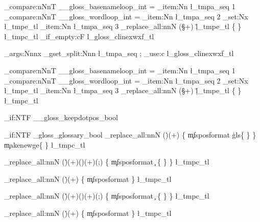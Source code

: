 {{		\int_compare:nNnT
								  { \g__gloss_basenameloop_int } = { \seq_item:Nn \l_tmpa_seq { 1 } } %
								  {
		\int_compare:nNnT
								  { \g__gloss_wordloop_int } = { \seq_item:Nn \l_tmpa_seq { 2 } } %
								  {
\tl_set:Nx \l_tmpe_tl { \seq_item:Nn \l_tmpa_seq { 3 } } %
		\regex_replace_all:nnN
				{ (\S+) }
				{ \c{\u{l_tmpe_tl}} \cB\{ \0 \cE\} }
				\l_tmpc_tl
												}}%
			}%
		\tl_if_empty:cF { l_gloss_clinexwxf_tl }
		{  
			\exp_args:Nnnx
	\seq_gset_split:Nnn 
		\l_tmpa_seq
			{ ; } %
			{ \tl_use:c { l_gloss_clinexwxf_tl } }
			
		\int_compare:nNnT
								  { \g__gloss_basenameloop_int } = { \seq_item:Nn \l_tmpa_seq { 1 } } %
								  {
		\int_compare:nNnT
								  { \g__gloss_wordloop_int } = { \seq_item:Nn \l_tmpa_seq { 2 } } %
								  {
\tl_set:Nx \l_tmpe_tl { \seq_item:Nn \l_tmpa_seq { 3 } } %
		\regex_replace_all:nnN
				{ (\S+) }
				{ \c{\u{l_tmpe_tl}} \cB\{ \0 \cE\} }
				\l_tmpc_tl
												}}%
			}%









		\bool_if:NTF
		\g__gloss_keepdotpos_bool
		{
			\bool_if:NTF
			\g_gloss_glossary_bool
			{
		\regex_replace_all:nnN
				{ (\.)(\w+) }
				{ \1 \cB\{ \c{mfsposformat} \c{gls}\cB\{ \2 \cE\} \cE\}
					\c{makenewge}\cB\{ \2 \cE\}
				} %
				\l_tmpc_tl
			}
			{

		\regex_replace_all:nnN
				{ (\.)(\w+)(\-)(\w+)(;) }
				{ \1 \cB\{ \c{mfsposformat} \c{\4} \cB\{ \2 \cE\} \cE\} } 
				\l_tmpc_tl

		\regex_replace_all:nnN
				{ (\.)(\w+) }
				{ \1 \cB\{ \c{mfsposformat} \2 \cE\} } 
				\l_tmpc_tl
			}
		}
		{
		\regex_replace_all:nnN
				{ (\.)(\w+)(\-)(\w+)(;) }
				{ \cB\{ \c{mfsposformat} \c{\4} \cB\{ \2 \cE\} \cE\} } 
				\l_tmpc_tl

		\regex_replace_all:nnN
				{ (\.)(\w+) }
				{ \cB\{ \c{mfsposformat} \2 \cE\} }
				\l_tmpc_tl
			}
			

}
